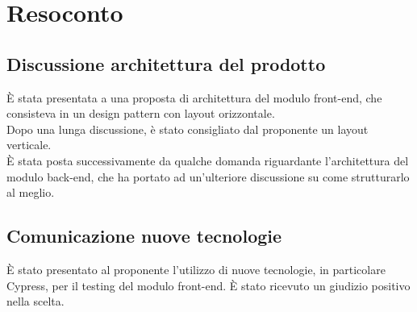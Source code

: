 \section{Resoconto}
\subsection{Discussione architettura del prodotto}

È stata presentata a \Proponente{} una proposta di architettura del modulo front-end, che consisteva in un design pattern con layout orizzontale.\\
Dopo una lunga discussione, è stato consigliato dal proponente un layout verticale.\\

È stata posta successivamente da \Proponente{} qualche domanda riguardante l'architettura del modulo back-end, che ha portato ad un'ulteriore discussione su come strutturarlo al meglio.

\subsection{Comunicazione nuove tecnologie}
È stato presentato al proponente l'utilizzo di nuove tecnologie, in particolare Cypress, per il testing del modulo front-end. È stato ricevuto un giudizio positivo nella scelta.
